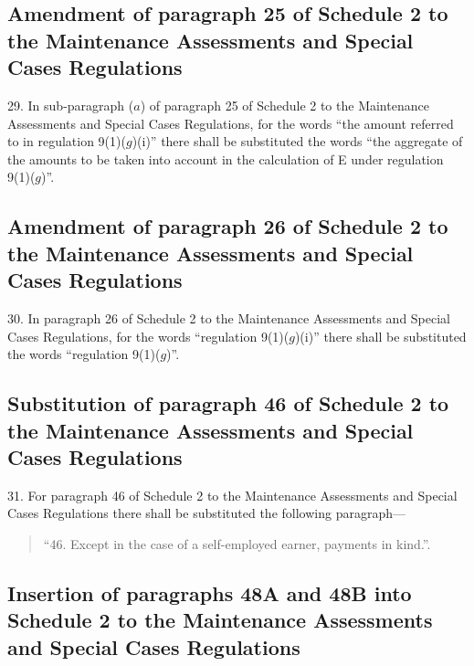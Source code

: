 \documentclass[12pt,a4paper]{article}
\begin{document}
\subsection[29. Amendment of paragraph 25 of Schedule 2 to the Maintenance Assessments and Special Cases Regulations]{Amendment of paragraph 25 of Schedule 2 to the Maintenance Assessments and Special Cases Regulations}

29.  In sub-paragraph ($a$) of paragraph 25 of Schedule 2 to the Maintenance Assessments and Special Cases Regulations, for the words “the amount referred to in regulation 9(1)($g$)(i)” there shall be substituted the words “the aggregate of the amounts to be taken into account in the calculation of E under regulation 9(1)($g$)”.

\subsection[30. Amendment of paragraph 26 of Schedule 2 to the Maintenance Assessments and Special Cases Regulations]{Amendment of paragraph 26 of Schedule 2 to the Maintenance Assessments and Special Cases Regulations}

30.  In paragraph 26 of Schedule 2 to the Maintenance Assessments and Special Cases Regulations, for the words “regulation 9(1)($g$)(i)” there shall be substituted the words “regulation 9(1)($g$)”.

\subsection[31. Substitution of paragraph 46 of Schedule 2 to the Maintenance Assessments and Special Cases Regulations]{Substitution of paragraph 46 of Schedule 2 to the Maintenance Assessments and Special Cases Regulations}

31.  For paragraph 46 of Schedule 2 to the Maintenance Assessments and Special Cases Regulations there shall be substituted the following paragraph---
\begin{quotation}
“46.  Except in the case of a self-employed earner, payments in kind.”.
\end{quotation}

\subsection[32. Insertion of paragraphs 48A and 48B into Schedule 2 to the Maintenance Assessments and Special Cases Regulations]{Insertion of paragraphs 48A and 48B into Schedule 2 to the Maintenance Assessments and Special Cases Regulations}
\end{document}
